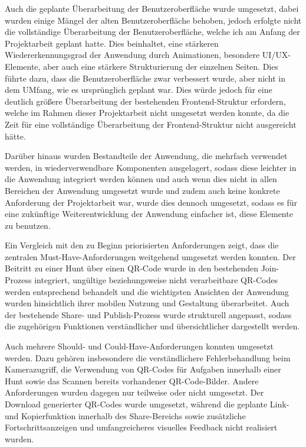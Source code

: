 ﻿\documentclass[oneside]{ausarbeitung}
\begin{document}
Auch die geplante Überarbeitung der Benutzeroberfläche wurde umgesetzt, dabei wurden einige Mängel der alten Benutzeroberfläche behoben, jedoch
erfolgte nicht die vollständige Überarbeitung der Benutzeroberfläche, welche ich am Anfang der Projektarbeit geplant hatte. Dies beinhaltet, eine 
stärkeren Wiedererkennungsgrad der Anwendung durch Animationen, besondere UI/UX-Elemente, aber auch eine stärkere Strukturierung der einzelnen Seiten.
Dies führte dazu, dass die Benutzeroberfläche zwar verbessert wurde, aber nicht in dem UMfang, wie es ursprünglich geplant war.
Dies würde jedoch für eine deutlich größere Überarbeitung der bestehenden Frontend-Struktur erfordern, welche im Rahmen dieser Projektarbeit nicht
umgesetzt werden konnte, da die Zeit für eine vollständige Überarbeitung der Frontend-Struktur nicht ausgereicht hätte.

Darüber hinaus wurden Bestandteile der Anwendung, die mehrfach verwendet werden, in wiederverwendbare Komponenten ausgelagert, sodass diese leichter
in die Anwendung integriert werden können und auch wenn dies nicht in allen Bereichen der Anwendung umgesetzt wurde und zudem auch keine konkrete 
Anforderung der Projektarbeit war, wurde dies dennoch umgesetzt, sodass es für eine zukünftige Weiterentwicklung der Anwendung einfacher ist, diese
Elemente zu benutzen.

Ein Vergleich mit den zu Beginn priorisierten Anforderungen zeigt, dass die zentralen Must-Have-Anforderungen weitgehend umgesetzt werden konnten.
Der Beitritt zu einer Hunt über einen QR-Code wurde in den bestehenden Join-Prozess integriert, ungültige beziehungsweise nicht verarbeitbare
QR-Codes werden entsprechend behandelt und die wichtigsten Ansichten der Anwendung wurden hinsichtlich ihrer mobilen Nutzung und Gestaltung
überarbeitet. Auch der bestehende Share- und Publish-Prozess wurde strukturell angepasst, sodass die zugehörigen Funktionen verständlicher
und übersichtlicher dargestellt werden.

Auch mehrere Should- und Could-Have-Anforderungen konnten umgesetzt werden. Dazu gehören insbesondere die verständlichere Fehlerbehandlung beim
Kamerazugriff, die Verwendung von QR-Codes für Aufgaben innerhalb einer Hunt sowie das Scannen bereits vorhandener QR-Code-Bilder.
Andere Anforderungen wurden dagegen nur teilweise oder nicht umgesetzt. Der Download generierter QR-Codes wurde umgesetzt, während die geplante
Link- und Kopierfunktion innerhalb des Share-Bereichs sowie zusätzliche Fortschrittsanzeigen und umfangreicheres visuelles Feedback nicht realisiert wurden.
\end{document}
